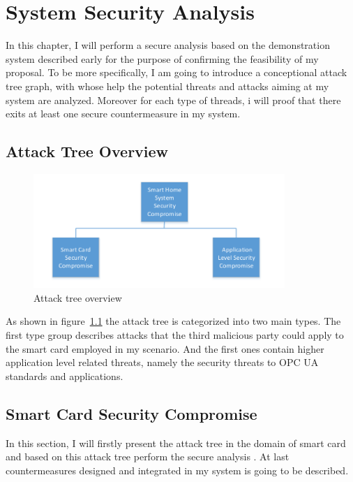 \chapter{System Security Analysis}
In this chapter, I will perform a secure analysis based on the demonstration system described early for the purpose of confirming the feasibility of my proposal. To be more specifically, I am going to introduce a conceptional attack tree graph, with whose help the potential threats and attacks aiming at my system are analyzed. Moreover for each type of threads, i will proof that there exits at least one secure countermeasure in my system.

\section{Attack Tree Overview}

 \begin{figure}[!htb]
	\centering
	\includegraphics[width=0.85\textwidth]{attack-tree-overview}
		\caption{Attack tree overview}
	\label{fig:attack-tree-overview}
\end{figure}
As shown in figure~\ref{fig:attack-tree-overview} the attack tree is categorized into two main types. The first type group describes attacks that the third malicious party could apply to the smart card employed in my scenario. And the first ones contain higher application level related threats, namely the security threats to OPC UA standards and applications. 

\section{Smart Card Security Compromise}
In this section, I will firstly present the attack tree in the domain of smart card and based on this attack tree  perform the secure analysis . At last countermeasures designed and integrated in my system is going to be described.

